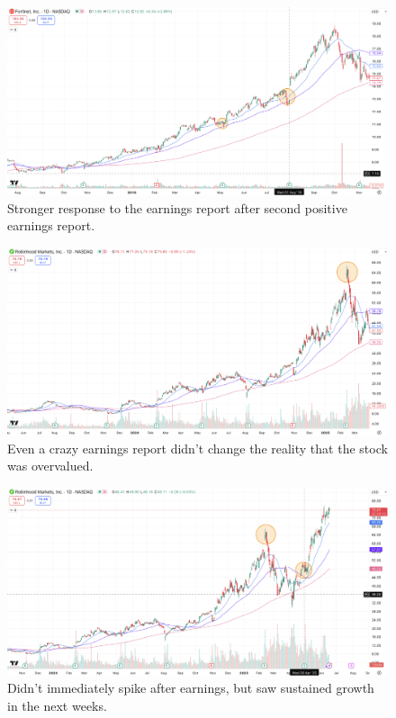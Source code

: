 \documentclass[11pt]{article}
\begin{document}
    \begin{figure}[H]
        \centering
        \includegraphics[width=1.0\linewidth]{images/FTNT2.png}
        \caption{Stronger response to the earnings report after second positive earnings report.}
        \label{fig:FTNT2}
    \end{figure}

    \begin{figure}[H]
        \centering
        \includegraphics[width=1.0\linewidth]{images/HOOD1.png}
        \caption{Even a crazy earnings report didn't change the reality that the stock was overvalued.}
        \label{fig:HOOD1}
    \end{figure}

    \begin{figure}[H]
        \centering
        \includegraphics[width=1.0\linewidth]{images/HOOD2.png}
        \caption{Didn't immediately spike after earnings, but saw sustained growth in the next weeks.}
        \label{fig:HOOD2}
    \end{figure}
\end{document}
